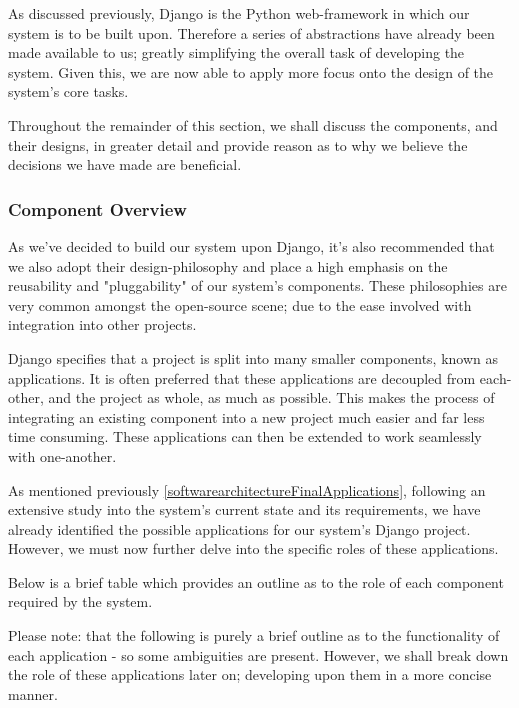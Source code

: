 		As discussed previously, Django is the Python web-framework in which our system is to be built upon. Therefore a series of abstractions have already been made available to us; greatly simplifying the overall task of developing the system. Given this, we are now able to apply more focus onto the design of the system's core tasks.
		
		Throughout the remainder of this section, we shall discuss the components, and their designs, in greater detail and provide reason as to why we believe the decisions we have made are beneficial.
	
	\subsubsection{Component Overview}
		As we've decided to build our system upon Django, it's also recommended that we also adopt their design-philosophy and place a high emphasis on the reusability and "pluggability" of our system's components. These philosophies are very common amongst the open-source scene; due to the ease involved with integration into other projects.
		
		Django specifies that a project is split into many smaller components, known as applications. It is often preferred that these applications are decoupled from each-other, and the project as whole, as much as possible. This makes the process of integrating an existing component into a new project much easier and far less time consuming. These applications can then be extended to work seamlessly with one-another.
		
		As mentioned previously \ref{softwarearchitectureFinalApplications}, following an extensive study into the system's current state and its requirements, we have already identified the possible applications for our system's Django project. However, we must now further delve into the specific roles of these applications.
		
		Below is a brief table which provides an outline as to the role of each component required by the system.
		
		Please note: that the following is purely a brief outline as to the functionality of each application - so some ambiguities are present.
		However, we shall break down the role of these applications later on; developing upon them in a more concise manner.
		
